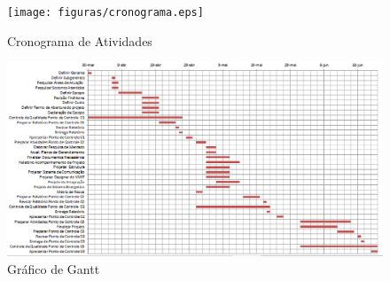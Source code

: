  \begin{figure}[ht]
	\centering
		\texttt{[image: figuras/cronograma.eps]}
	\caption{Cronograma de Atividades}
\end{figure}

 \begin{figure}[ht]
	\centering
		\includegraphics[keepaspectratio=true,scale=0.5]{figuras/gantt.eps}
	\caption{Gráfico de Gantt}
\end{figure}


